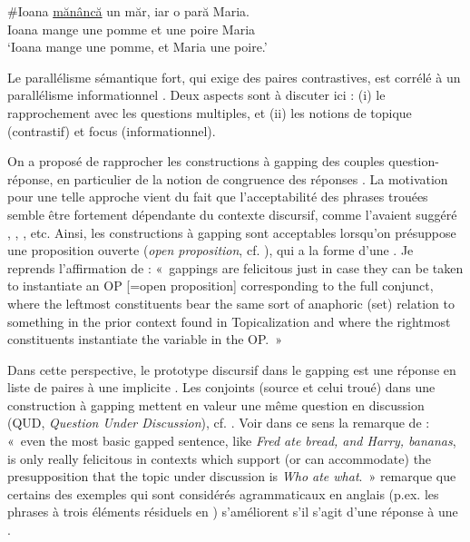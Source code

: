 \ea \label{ch2:ex176}
\gll \#Ioana  \uline{mănâncă}  un  măr,  iar  o  pară  Maria.\\
Ioana  mange  une  pomme  et  une  poire  Maria\\
\glt ‘Ioana mange une pomme, et Maria une poire.’    
\z

Le parallélisme sémantique fort, qui exige des paires contrastives, est corrélé à un parallélisme informationnel \citep{Winkler2005}. Deux aspects sont à discuter ici : (i) le rapprochement avec les questions multiples, et (ii) les notions de topique (contrastif) et focus (informationnel).

On a proposé de rapprocher les constructions à gapping des couples question-réponse, en particulier de la notion de congruence des réponses \citep{Kuno1976,Kuno1982,Steedman2000,Reich2006,Winkler2005,Hoyt2008,Repp2009,Johnson2014}. La motivation pour une telle approche vient du fait que l’acceptabilité des phrases trouées semble être fortement dépendante du contexte discursif, comme l’avaient suggéré \citet{Kuno1976}, \citet{Prince1986}, \citet{Steedman2000}, etc. Ainsi, les constructions à gapping sont acceptables lorsqu’on présuppose une proposition ouverte (\textit{open proposition}, cf. \citealt{Prince1986}), qui a la forme d’une . Je reprends l’affirmation de \citet[212]{Prince1986} : «~gappings are felicitous just in case they can be taken to instantiate an OP [=open proposition] corresponding to the full conjunct, where the leftmost constituents bear the same sort of anaphoric (set) relation to something in the prior context found in Topicalization and where the rightmost constituents instantiate the variable in the OP.~»

Dans cette perspective, le prototype discursif dans le gapping est une réponse en liste de paires à une  implicite . Les conjoints (source et celui troué) dans une construction à gapping mettent en valeur une même question en discussion (QUD, {\cad} \textit{Question Under Discussion}), cf. \citet{Reich2006}. Voir dans ce sens la remarque de \citet[248]{Steedman1990} : «~even the most basic gapped sentence, like \textit{Fred ate bread, and Harry, bananas}, is only really felicitous in contexts which support (or can accommodate) the presupposition that the topic under discussion is \textit{Who ate what}.~» \citet{Johnson2014} remarque que certains des exemples qui sont considérés agrammaticaux en anglais (p.ex. les phrases à trois éléments résiduels en ) s’améliorent s’il s’agit d’une réponse à une  .


